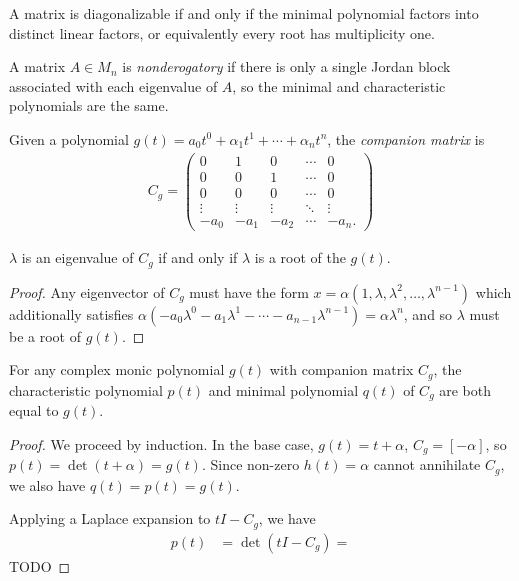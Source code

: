 \begin{cor}
    A matrix is diagonalizable if and only if the minimal polynomial factors into distinct linear factors, or equivalently every root has multiplicity one.
\end{cor}

\begin{defn}
    A matrix $A \in M_n$ is \emph{nonderogatory} if there is only a single Jordan block associated with each eigenvalue of $A$, so the minimal and characteristic polynomials are the same.
\end{defn}

\begin{defn}
    Given a polynomial $g(t) = a_0 t^0 + \alpha_1 t^1 + \cdots + \alpha_n t^n$, the \emph{companion matrix} is
    \begin{align*}
        C_g = \begin{pmatrix}
            0 & 1 & 0 & \cdots & 0 \\
            0 & 0 & 1 & \cdots & 0 \\
            0 & 0 & 0 & \cdots & 0 \\
            \vdots & \vdots & \vdots & \ddots & \vdots \\
            -a_0 & -a_1 & -a_2 & \cdots & -a_n.
        \end{pmatrix}
    \end{align*}
\end{defn}

\begin{prop}
    $\lambda$ is an eigenvalue of $C_g$ if and only if $\lambda$ is a root of the $g(t)$.
\end{prop}

\begin{proof}
    Any eigenvector of $C_g$ must have the form $x = \alpha(1, \lambda, \lambda^2, \ldots, \lambda^{n-1})$ which additionally satisfies $\alpha(-a_0 \lambda^0 - a_1\lambda^1 - \cdots - a_{n-1}\lambda^{n-1}) = \alpha \lambda^n$, and so $\lambda$ must be a root of $g(t)$.
\end{proof}

\begin{prop}
    For any complex monic polynomial $g(t)$ with companion matrix $C_g$, the characteristic polynomial $p(t)$ and minimal polynomial $q(t)$ of $C_g$ are both equal to $g(t)$.
\end{prop}

\begin{proof}
    We proceed by induction. In the base case, $g(t) = t + \alpha$, $C_g = [-\alpha]$, so $p(t) = \det(t + \alpha) = g(t)$. Since non-zero $h(t) = \alpha$ cannot annihilate $C_g$, we also have $q(t) = p(t) = g(t)$.

    Applying a Laplace expansion to $tI - C_g$, we have
    \begin{align*}
        p(t) &= \det(tI - C_g) = 
    \end{align*}
    {\color{red}\Large TODO}
\end{proof}

